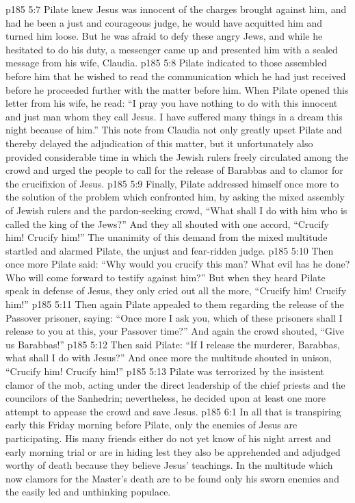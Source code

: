 \vs p185 5:7 Pilate knew Jesus was innocent of the charges brought against him, and had he been a just and courageous judge, he would have acquitted him and turned him loose. But he was afraid to defy these angry Jews, and while he hesitated to do his duty, a messenger came up and presented him with a sealed message from his wife, Claudia.
\vs p185 5:8 Pilate indicated to those assembled before him that he wished to read the communication which he had just received before he proceeded further with the matter before him. When Pilate opened this letter from his wife, he read: “I pray you have nothing to do with this innocent and just man whom they call Jesus. I have suffered many things in a dream this night because of him.” This note from Claudia not only greatly upset Pilate and thereby delayed the adjudication of this matter, but it unfortunately also provided considerable time in which the Jewish rulers freely circulated among the crowd and urged the people to call for the release of Barabbas and to clamor for the crucifixion of Jesus.
\vs p185 5:9 Finally, Pilate addressed himself once more to the solution of the problem which confronted him, by asking the mixed assembly of Jewish rulers and the pardon\hyp{}seeking crowd, “What shall I do with him who is called the king of the Jews?” And they all shouted with one accord, “Crucify him! Crucify him!” The unanimity of this demand from the mixed multitude startled and alarmed Pilate, the unjust and fear\hyp{}ridden judge.
\vs p185 5:10 Then once more Pilate said: “Why would you crucify this man? What evil has he done? Who will come forward to testify against him?” But when they heard Pilate speak in defense of Jesus, they only cried out all the more, “Crucify him! Crucify him!”
\vs p185 5:11 Then again Pilate appealed to them regarding the release of the Passover prisoner, saying: “Once more I ask you, which of these prisoners shall I release to you at this, your Passover time?” And again the crowd shouted, “Give us Barabbas!”
\vs p185 5:12 Then said Pilate: “If I release the murderer, Barabbas, what shall I do with Jesus?” And once more the multitude shouted in unison, “Crucify him! Crucify him!”
\vs p185 5:13 Pilate was terrorized by the insistent clamor of the mob, acting under the direct leadership of the chief priests and the councilors of the Sanhedrin; nevertheless, he decided upon at least one more attempt to appease the crowd and save Jesus.
\vs p185 6:1 In all that is transpiring early this Friday morning before Pilate, only the enemies of Jesus are participating. His many friends either do not yet know of his night arrest and early morning trial or are in hiding lest they also be apprehended and adjudged worthy of death because they believe Jesus’ teachings. In the multitude which now clamors for the Master’s death are to be found only his sworn enemies and the easily led and unthinking populace.
